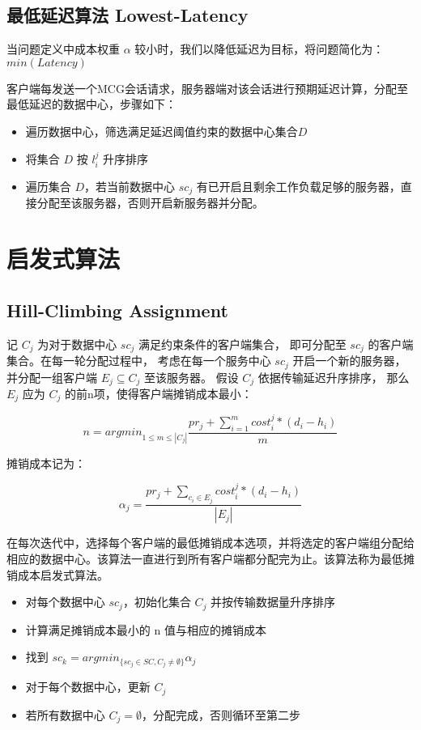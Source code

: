 \subsection{最低延迟算法 Lowest-Latency}
当问题定义中成本权重 $ \alpha $ 较小时，我们以降低延迟为目标，将问题简化为：
$ min(Latency) $

客户端每发送一个MCG会话请求，服务器端对该会话进行预期延迟计算，分配至最低延迟的数据中心，步骤如下：
\begin{itemize}
    \item 遍历数据中心，筛选满足延迟阈值约束的数据中心集合$D$
    \item 将集合 $D$ 按 $l_i^j$ 升序排序
    \item 遍历集合 $D$，若当前数据中心 $sc_j$ 有已开启且剩余工作负载足够的服务器，直接分配至该服务器，否则开启新服务器并分配。
\end{itemize}

\section{启发式算法}
\subsection{Hill-Climbing Assignment}
记 $ C_j $ 为对于数据中心 $sc_j$ 满足约束条件的客户端集合，
即可分配至 $sc_j$ 的客户端集合。在每一轮分配过程中，
考虑在每一个服务中心 $sc_j$ 开启一个新的服务器，
并分配一组客户端 $ E_j \subseteq C_j $ 至该服务器。
假设 $ C_j $ 依据传输延迟升序排序，
那么 $ E_j $ 应为 $ C_j $ 的前n项，使得客户端摊销成本最小：

$$ n = argmin_{1 \leq m \leq |C_j|}{\frac{pr_j+\sum_{i=1}^m{cost_i^j * (d_i-h_i)}}{m}} $$

摊销成本记为：

$$ \alpha_j=\frac{pr_j+\sum_{c_i \in E_j}{cost_i^j * (d_i-h_i)}}{|E_j|} $$

在每次迭代中，选择每个客户端的最低摊销成本选项，并将选定的客户端组分配给相应的数据中心。该算法一直进行到所有客户端都分配完为止。该算法称为最低摊销成本启发式算法。

\begin{itemize}
    \item 对每个数据中心 $ sc_j $，初始化集合 $C_j$ 并按传输数据量升序排序
    \item 计算满足摊销成本最小的 n 值与相应的摊销成本
    \item 找到 $ sc_{k}=argmin_{\{sc_j\in SC, C_j\neq \emptyset\}}{\alpha_j} $
    \item 对于每个数据中心，更新 $C_j$
    \item 若所有数据中心 $C_j = \emptyset$，分配完成，否则循环至第二步
\end{itemize}

